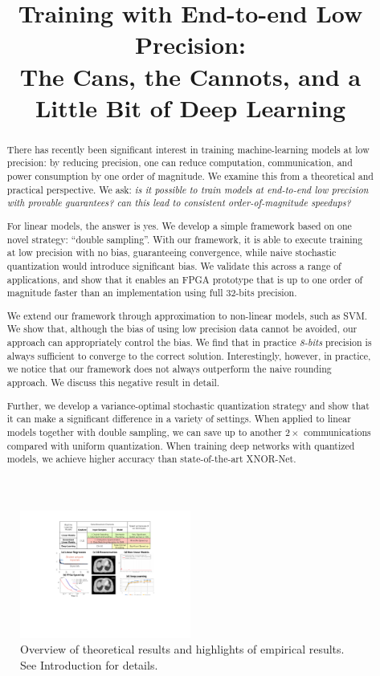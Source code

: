 \documentclass{article}
\date{}
\title{Training with End-to-end Low Precision:\\
The Cans, the Cannots, and a Little Bit of Deep Learning
}
\begin{document}
\maketitle

\begin{abstract}

There has recently been significant interest in training 
machine-learning models at low precision: by reducing 
precision, one can reduce computation, communication, and power 
consumption by one order of magnitude. 
We examine this from a theoretical and practical 
perspective. We ask: 
{\em is it possible to \emph{train} models at end-to-end low 
precision with \emph{provable} guarantees?  can this 
lead to consistent order-of-magnitude speedups?}

For linear models, the answer is yes. We develop a simple 
framework based on one novel strategy: ``double sampling''. 
With our framework, it is able 
to execute training at low precision with no bias, 
guaranteeing convergence, while naive stochastic quantization 
would introduce significant bias. We validate this  
across a range of applications, and show that it enables an 
FPGA prototype that is up to one order of magnitude faster 
than an implementation using full 32-bits precision.

We extend our framework through approximation to non-linear 
models, such as SVM. We show that, although the bias of using 
low precision data cannot be avoided, our approach can appropriately 
control the bias. We find that in practice {\em 8-bits} precision is 
always sufficient to converge to the correct solution. 
Interestingly, however, in practice, we notice that our framework 
does not always outperform the naive rounding approach. We discuss 
this negative result in detail. 

Further, we develop a variance-optimal 
stochastic quantization
strategy and show that 
it can make a significant difference in a variety of settings. 
When applied to linear models together with 
double sampling, we can save up to another 
$2\times$ communications
compared with uniform quantization. When
training deep networks with quantized models, 
we achieve higher accuracy than state-of-the-art XNOR-Net. 

\end{abstract}

\begin{figure}[t]
\centering
\includegraphics[width=0.5\textwidth]{Figures/RSHighlight}    
\vspace{-2em}
\caption{Overview of theoretical results and
highlights of empirical results. See
Introduction for details.}
\vspace{-1em}
\label{fig:highlight}
\end{figure}
\end{document}
